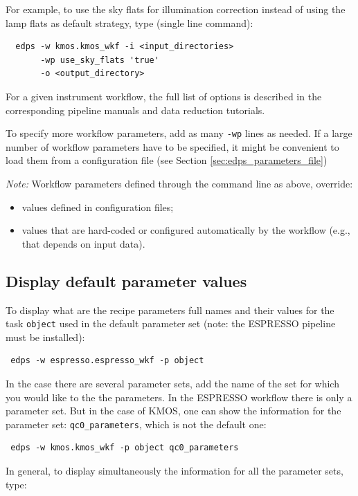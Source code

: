 For example, to use the sky flats for illumination correction instead of using the lamp flats as default strategy, type (single line command):
\begin{verbatim}
  edps -w kmos.kmos_wkf -i <input_directories> 
       -wp use_sky_flats 'true'
       -o <output_directory> 
 \end{verbatim}

For a given instrument workflow, the full list of options is described in the corresponding pipeline manuals and data reduction tutorials.


To specify more workflow parameters, add as many {\tt -wp} lines as needed. If a large number of workflow parameters have to be specified, it might be convenient to  load them from a configuration file (see Section \ref{sec:edps_parameters_file})

{\it Note:} Workflow parameters defined  through the command line as above, override:
\begin{itemize}
    \item values defined in configuration files;
    \item values that are hard-coded or configured automatically by the workflow (e.g., that depends on input data).
\end{itemize}



\subsection{Display default parameter values}
\label{sec:edps_default_params}
To display what are the recipe parameters full names and their values for the task {\tt object} used in the default parameter set (note: the ESPRESSO pipeline must be installed):

\begin{verbatim}
 edps -w espresso.espresso_wkf -p object
\end{verbatim}

In the case there are several parameter sets, add the name of the set for which you would like to the the parameters. In the ESPRESSO workflow there is only a parameter set. But in the case of KMOS, one can show the information for the parameter set: {\tt qc0\_parameters}, which is not the default one:

\begin{verbatim}
 edps -w kmos.kmos_wkf -p object qc0_parameters
\end{verbatim}

In general, to display simultaneously the information for all the parameter sets, type:

